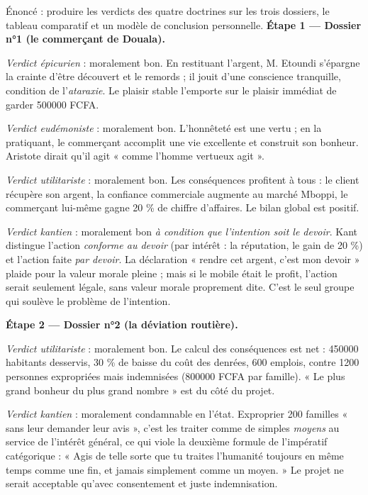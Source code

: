 \documentclass[11pt]{article}
\newcommand{\cle}[1]{{\popxbold\color{popdark}#1}}
\begin{document}
\begin{exoresolu}
Énoncé : produire les verdicts des quatre doctrines sur les trois dossiers, le tableau comparatif et un modèle de conclusion personnelle.
\tcblower
\textbf{Étape 1 — Dossier n°1 (le commerçant de Douala).}

\emph{Verdict épicurien} : moralement bon. En restituant l'argent, M. Etoundi s'épargne la crainte d'être découvert et le remords ; il jouit d'une conscience tranquille, condition de l'\emph{ataraxie}. Le plaisir stable l'emporte sur le plaisir immédiat de garder \num{500000} FCFA.

\emph{Verdict eudémoniste} : moralement bon. L'honnêteté est une \cle{vertu} ; en la pratiquant, le commerçant accomplit une vie excellente et construit son bonheur. Aristote dirait qu'il agit « comme l'homme vertueux agit ».

\emph{Verdict utilitariste} : moralement bon. Les conséquences profitent à tous : le client récupère son argent, la confiance commerciale augmente au marché Mboppi, le commerçant lui-même gagne 20 \% de chiffre d'affaires. Le bilan global est positif.

\emph{Verdict kantien} : moralement bon \emph{à condition que l'intention soit le devoir}. Kant distingue l'action \emph{conforme au devoir} (par intérêt : la réputation, le gain de 20 \%) et l'action faite \emph{par devoir}. La déclaration « rendre cet argent, c'est mon devoir » plaide pour la valeur morale pleine ; mais si le mobile était le profit, l'action serait seulement légale, sans valeur morale proprement dite. C'est le seul groupe qui soulève le problème de l'\cle{intention}.

\textbf{Étape 2 — Dossier n°2 (la déviation routière).}

\emph{Verdict utilitariste} : moralement bon. Le calcul des conséquences est net : \num{450000} habitants desservis, 30 \% de baisse du coût des denrées, 600 emplois, contre \num{1200} personnes expropriées mais indemnisées (\num{800000} FCFA par famille). « Le plus grand bonheur du plus grand nombre » est du côté du projet.

\emph{Verdict kantien} : moralement condamnable en l'état. Exproprier 200 familles « sans leur demander leur avis », c'est les traiter comme de simples \emph{moyens} au service de l'intérêt général, ce qui viole la deuxième formule de l'impératif catégorique : « Agis de telle sorte que tu traites l'humanité toujours en même temps comme une fin, et jamais simplement comme un moyen. » Le projet ne serait acceptable qu'avec consentement et juste indemnisation.


\end{exoresolu}
\end{document}
